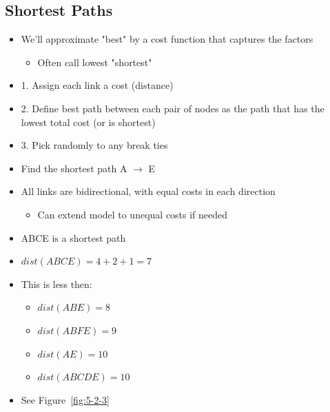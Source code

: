 \documentclass[12pt]{ctexart}   %
\begin{document}
	\subsection{Shortest Paths}
	\begin{itemize}
		\item We'll approximate "best" by a cost function that captures the factors
		\begin{itemize}
			\item Often call lowest "shortest"
		\end{itemize}
		
		\item {\color{blue} 1.} Assign each link a cost (distance)
		\item {\color{blue} 2.} Define best path between each pair of nodes as the path that has the lowest total cost (or is shortest)
		\item {\color{blue} 3.} Pick randomly to any break ties
		
		\item Find the shortest path A $\rightarrow$ E
		\item All links are bidirectional, with equal costs in each direction
		\begin{itemize}
			\item Can extend model to unequal costs if needed
		\end{itemize}
		
		\item ABCE is a shortest path
		\item $dist(ABCE) = 4 + 2 + 1 = 7$
		\item This is less then:
		\begin{itemize}
			\item $dist(ABE) = 8$
			\item $dist(ABFE) = 9$
			\item $dist(AE) = 10$
			\item $dist(ABCDE) = 10$
		\end{itemize}
		\item See Figure~\ref{fig:5-2-3}
			

\end{itemize}
\end{document}
